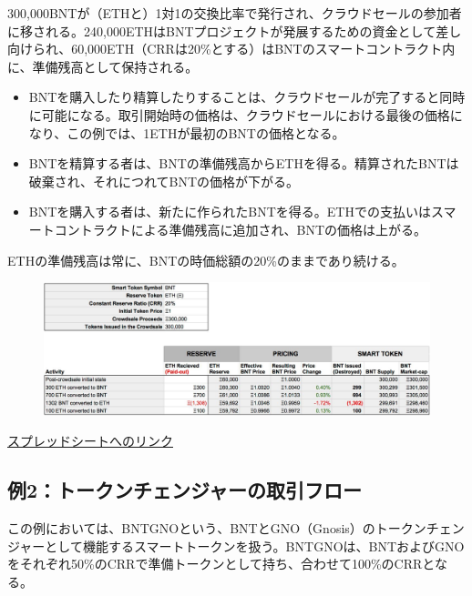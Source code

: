 \documentclass{jsarticle}
\begin{document}
   300,000BNTが（ETHと）1対1の交換比率で発行され、クラウドセールの参加者に移される。240,000ETHはBNTプロジェクトが発展するための資金として差し向けられ、60,000ETH（CRRは20\%とする）はBNTのスマートコントラクト内に、準備残高として保持される。

   \begin{itemize}
    \item BNTを購入したり精算したりすることは、クラウドセールが完了すると同時に可能になる。取引開始時の価格は、クラウドセールにおける最後の価格になり、この例では、1ETHが最初のBNTの価格となる。
    \item BNTを精算する者は、BNTの準備残高からETHを得る。精算されたBNTは破棄され、それにつれてBNTの価格が下がる。
    \item BNTを購入する者は、新たに作られたBNTを得る。ETHでの支払いはスマートコントラクトによる準備残高に追加され、BNTの価格は上がる。
   \end{itemize}

   ETHの準備残高は常に、BNTの時価総額の20\%のままであり続ける。

   \begin{figure}[h]
    \begin{center}
     \includegraphics[scale=0.3]{fig2.png}
    \end{center}
   \end{figure}

   \href{https://goo.gl/3hR6e8}{スプレッドシートへのリンク}

  \subsection{例2：トークンチェンジャーの取引フロー}

  この例においては、BNTGNOという、BNTとGNO（Gnosis）のトークンチェンジャーとして機能するスマートトークンを扱う。BNTGNOは、BNTおよびGNOをそれぞれ50\%のCRRで準備トークンとして持ち、合わせて100\%のCRRとなる。
\end{document}
